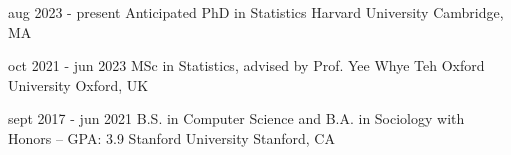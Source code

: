 

\begin{cventries}

  \cvedentry
    {aug 2023 - present} %
    {Anticipated PhD in Statistics} %
    {Harvard University} %
    {Cambridge, MA} %
    
  \cvedentry
    {oct 2021 - jun 2023} %
    {MSc in Statistics, advised by Prof. Yee Whye Teh} %
    {Oxford University} %
    {Oxford, UK} %
  
  \cvedentry
    {sept 2017 - jun 2021} %
    {B.S. in Computer Science and B.A. in Sociology with Honors -- GPA: {\normalsize 3.9}} %
    {Stanford University} %
    {Stanford, CA} %

\end{cventries}

